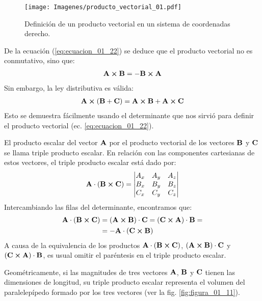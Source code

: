 \begin{figure}[H]
    \centering
    \texttt{[image: Imagenes/producto\_vectorial\_01.pdf]}
    \caption{Definición de un producto vectorial en un sistema de coordenadas derecho.}
    \label{fig:figura_01_10}
\end{figure}
De la ecuación (\ref{eq:ecuacion_01_22}) se deduce que el producto vectorial no es conmutativo, sino que:
\begin{align}
    \vb{A} \cp \vb{B} = - \vb{B} \cp \vb{A}
    \label{eq:ecuacion_01_25}
\end{align} 
Sin embargo, la ley distributiva es válida:
\begin{align}
    \vb{A} \cp \left( \vb{B} + \vb{C} \right) = \vb{A} \cp \vb{B} + \vb{A} \cp \vb{C}
    \label{eq:ecuacion_01_26}   
\end{align}
Esto se demuestra fácilmente usando el determinante que nos sirvió para definir el producto vectorial (ec. \ref{eq:ecuacion_01_22}). 
\par
El producto escalar del vector $\vb{A}$ por el producto vectorial de los vectores $\vb{B}$ y $\vb{C}$ se llama triple producto escalar. En relación con las componentes cartesianas de estos vectores, el triple producto escalar está dado por:
\begin{align}
    \vb{A} \cdot \left( \vb{B} \cp \vb{C} \right) = \mdet{
        A_{x} & A_{y} & A_{z} \\
        B_{x} & B_{y} & B_{z} \\
        C_{x} & C_{y} & C_{z} }
    \label{eq:ecuacion_01_27}
\end{align}
Intercambiando las filas del determinante, encontramos que:
\begin{align}
\begin{aligned}[b]
    \vb{A} \cdot \left( \vb{B} \cp \vb{C} \right) &= \left( \vb{A} \cp \vb{B} \right) \cdot \vb{C} = \left( \vb{C} \cp \vb{A} \right) \cdot \vb{B} = \\
    &= - \vb{A} \cdot \left( \vb{C} \cp \vb{B} \right)
\end{aligned}
\label{eq:ecuacion_01_28}
\end{align}
A causa de la equivalencia de los productos $\vb{A} \cdot \left( \vb{B} \cp \vb{C} \right)$, $\left( \vb{A} \cp \vb{B} \right) \cdot \vb{C}$ y $\left( \vb{C} \cp \vb{A} \right) \cdot \vb{B}$, es usual omitir el paréntesis en el triple producto escalar. 
\par
Geométricamente, si las magnitudes de tres vectores $\vb{A}$, $\vb{B}$ y $\vb{C}$ tienen las dimensiones de longitud, su triple producto escalar representa el volumen del paralelepípedo formado por los tres vectores (ver la fig. \ref{fig:figura_01_11}).

